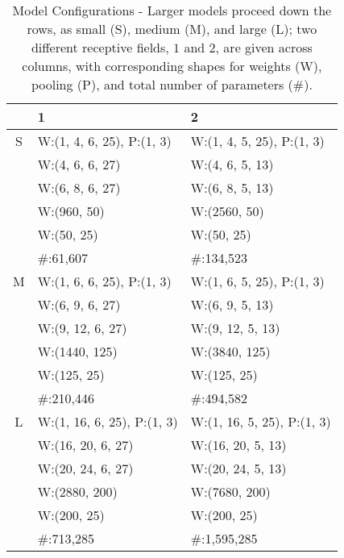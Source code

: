 \begin{table}[!t]
\renewcommand{\arraystretch}{1.4}
\caption{Model Configurations - Larger models proceed down the rows, as small (S), medium (M), and large (L); two different receptive fields, $1$ and $2$, are given across columns, with corresponding shapes for weights (W), pooling (P), and total number of parameters (\#).}
\label{tab:model_configs}
\centering
\begin{tabular}{c || l || l |}
 & 1 & 2 \\
\hline
 S & W:(1, 4, 6, 25), P:(1, 3)& W:(1, 4, 5, 25), P:(1, 3)\\
 &W:(4, 6, 6, 27) & W:(4, 6, 5, 13) \\
 &W:(6, 8, 6, 27) & W:(6, 8, 5, 13) \\
 &W:(960, 50)  & W:(2560, 50)\\
 &W:(50, 25)  & W:(50, 25)\\
 &\#:61,607  & \#:134,523\\
\hline
 M & W:(1, 6, 6, 25), P:(1, 3)& W:(1, 6, 5, 25), P:(1, 3)\\
 &W:(6, 9, 6, 27) & W:(6, 9, 5, 13) \\
 &W:(9, 12, 6, 27) & W:(9, 12, 5, 13) \\
 &W:(1440, 125)  & W:(3840, 125)\\
 &W:(125, 25)  & W:(125, 25)\\
 &\#:210,446  & \#:494,582\\
\hline
 L & W:(1, 16, 6, 25), P:(1, 3)& W:(1, 16, 5, 25), P:(1, 3)\\
 &W:(16, 20, 6, 27) & W:(16, 20, 5, 13) \\
 &W:(20, 24, 6, 27) & W:(20, 24, 5, 13) \\
 &W:(2880, 200)  & W:(7680, 200)\\
 &W:(200, 25)  & W:(200, 25)\\
 &\#:713,285  & \#:1,595,285\\
\hline
\end{tabular}
\end{table}


